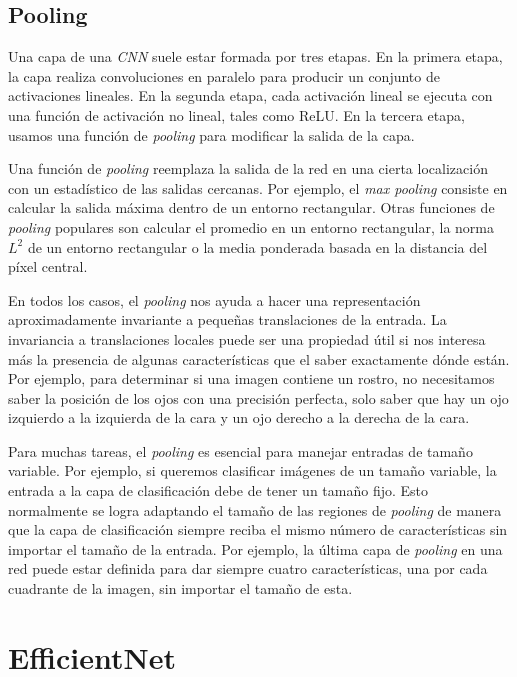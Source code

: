 \subsection{Pooling}

Una capa de una \textit{CNN} suele estar formada por tres etapas. En la primera etapa, la capa realiza convoluciones en paralelo para producir un conjunto de activaciones lineales. En la segunda etapa, cada activación lineal se ejecuta con una función de activación no lineal, tales como ReLU. En la tercera etapa, usamos una función de \textit{pooling} para modificar la salida de la capa.

Una función de \textit{pooling} reemplaza la salida de la red en una cierta localización con un estadístico de las salidas cercanas. Por ejemplo, el \textit{max pooling} consiste en calcular la salida máxima dentro de un entorno rectangular. Otras funciones de \textit{pooling} populares son calcular el promedio en un entorno rectangular, la norma $L^2$ de un entorno rectangular o la media ponderada basada en la distancia del píxel central.

En todos los casos, el \textit{pooling} nos ayuda a hacer una representación aproximadamente invariante a pequeñas translaciones de la entrada. La invariancia a translaciones locales puede ser una propiedad útil si nos interesa más la presencia de algunas características que el saber exactamente dónde están. Por ejemplo, para determinar si una imagen contiene un rostro, no necesitamos saber la posición de los ojos con una precisión perfecta, solo saber que hay un ojo izquierdo a la izquierda de la cara y un ojo derecho a la derecha de la cara.

Para muchas tareas, el \textit{pooling} es esencial para manejar entradas de tamaño variable. Por ejemplo, si queremos clasificar imágenes de un tamaño variable, la entrada a la capa de clasificación debe de tener un tamaño fijo. Esto normalmente se logra adaptando el tamaño de las regiones de \textit{pooling} de manera que la capa de clasificación siempre reciba el mismo número de características sin importar el tamaño de la entrada. Por ejemplo, la última capa de \textit{pooling} en una red puede estar definida para dar siempre cuatro características, una por cada cuadrante de la imagen, sin importar el tamaño de esta.

\section{EfficientNet}

